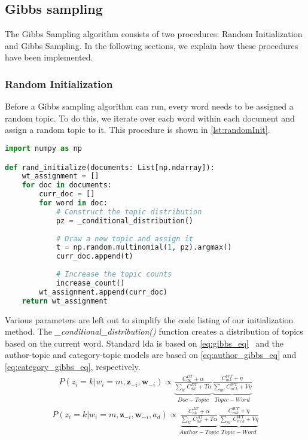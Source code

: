 \subsection{Gibbs sampling}\label{sec:appendix_gibbs}
The Gibbs Sampling algorithm consists of two procedures: Random Initialization and Gibbs Sampling.
In the following sections, we explain how these procedures have been implemented.

\subsubsection{Random Initialization}
Before a Gibbs sampling algorithm can run, every word needs to be assigned a random topic.
To do this, we iterate over each word within each document and assign a random topic to it.
This procedure is shown in \autoref{lst:randomInit}.
\begin{lstlisting}[language=Python, caption=Random Initialization for the Gibbs sampler.,label={lst:randomInit}, float, floatplacement=H]
import numpy as np

def rand_initialize(documents: List[np.ndarray]):
	wt_assignment = []
	for doc in documents:
		curr_doc = []
		for word in doc:
			# Construct the topic distribution
			pz = _conditional_distribution()
			
			# Draw a new topic and assign it
			t = np.random.multinomial(1, pz).argmax()
			curr_doc.append(t)
			
			# Increase the topic counts
			increase_count()
		wt_assignment.append(curr_doc)
	return wt_assignment
\end{lstlisting}
Various parameters are left out to simplify the code listing of our initialization method.
The \emph{\_conditional\_distribution()} function creates a distribution of topics based on the current word.
Standard \gls{lda} is based on \autoref{eq:gibbs_eq}~\cite{author_topic_2012} and the author-topic and category-topic models are based on \autoref{eq:author_gibbs_eq} and \autoref{eq:category_gibbs_eq}, respectively.
\begin{equation}\label{eq:gibbs_eq}
	\begin{split}
		P(z_i = k|w_i = m, \boldsymbol{z}_{-i}, \boldsymbol{w}_{-i}) \propto 
		\underbrace{\frac{C^{DT}_{dk} + \alpha}{\sum_{k'} C^{DT}_{dk'} + T\alpha}}_{Doc-Topic}
		\underbrace{\frac{C^{WT}_{mk} + \eta}{\sum_{m'} C^{WT}_{m'k} + V\eta}}_{Topic-Word}
	\end{split}
\end{equation}
\begin{equation}\label{eq:author_gibbs_eq}
	\begin{split}
		P(z_i = k|w_i = m, \boldsymbol{z}_{-i}, \boldsymbol{w}_{-i}, a_d) \propto 
		\underbrace{\frac{C^{AT}_{ak} + \alpha}{\sum_{k'} C^{AT}_{ak'} + T\alpha}}_{Author-Topic}
		\underbrace{\frac{C^{WT}_{mk} + \eta}{\sum_{m'} C^{WT}_{m'k} + V\eta}}_{Topic-Word}
	\end{split}
\end{equation}
